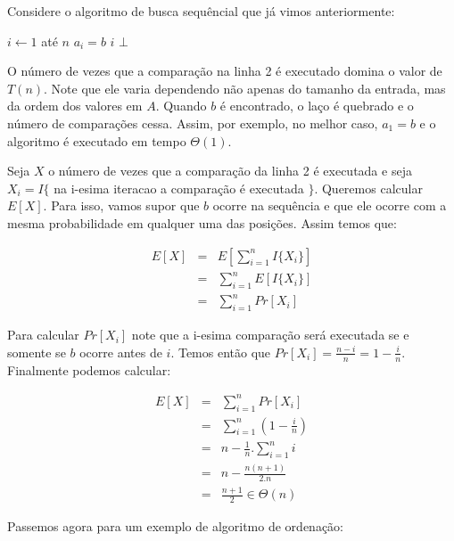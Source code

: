 \begin{example}
  Considere o algoritmo de busca sequêncial que já vimos anteriormente:

  \begin{codebox}
    \li \For $i \gets 1$ até $n$
    \li \Do \If $a_i = b$
    \li     \Then \Return $i$
        \End
    \End
    \li \Return $\bot$
  \end{codebox}


O número de vezes que a comparação na linha 2 é executado domina o valor de $T(n)$.
Note que ele varia dependendo não apenas do tamanho da entrada, mas da ordem dos valores em $A$.
Quando $b$ é encontrado, o laço é quebrado e o número de comparações cessa.
Assim, por exemplo, no melhor caso, $a_1 = b$ e o algoritmo é executado em tempo $\Theta(1)$.

Seja $X$ o número de vezes que a comparação da linha 2 é executada e seja $X_i = I\{$ na i-esima iteracao a comparação é executada $\}$.
Queremos calcular $E[X]$.
Para isso, vamos supor que $b$ ocorre na sequência e que ele ocorre com a mesma probabilidade em qualquer uma das posições.
Assim temos que:

\begin{eqnarray*}
  E[X] & = & E\left[\sum_{i=1}^nI\{X_i\}\right] \\
  & = & \sum_{i=1}^nE[I\{X_i\}]\\
  & = & \sum_{i=1}^n Pr[X_i]
\end{eqnarray*}

Para calcular $Pr[X_i]$ note que a i-esima comparação será executada se e somente se $b$ ocorre antes de $i$.
Temos então que $Pr[X_i] = \frac{n-i}{n} = 1 - \frac{i}{n}$.
Finalmente podemos calcular:

\begin{eqnarray*}
  E[X] & = & \sum_{i=1}^n Pr[X_i] \\
  & = & \sum_{i=1}^n \left(1 - \frac{i}{n} \right)\\
  & = & n - \frac{1}{n}. \sum_{i=1}^ni\\
  & = & n - \frac{n(n+1)}{2.n}\\
  & = & \frac{n+1}{2} \in \Theta(n) 
\end{eqnarray*}
\end{example}

Passemos agora para um exemplo de algoritmo de ordenação:

